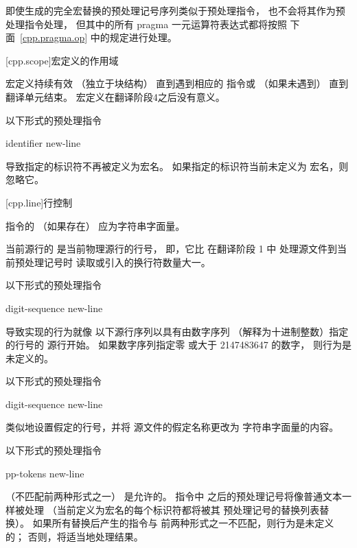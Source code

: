     \pnum
    即使生成的完全宏替换的预处理记号序列类似于预处理指令，
    也不会将其作为预处理指令处理，
    但其中的所有 pragma 一元运算符表达式都将按照
    下面~\ref{cpp.pragma.op} 中的规定进行处理。
    
    [cpp.scope]{宏定义的作用域}%
    
    \pnum
    宏定义持续有效
    （独立于块结构）
    直到遇到相应的
    指令或
    （如果未遇到）
    直到翻译单元结束。
    宏定义在翻译阶段4之后没有意义。
    
    \pnum
    以下形式的预处理指令
    \begin{ncsimplebnf}
     identifier new-line
    \end{ncsimplebnf}
    导致指定的标识符不再被定义为宏名。
    如果指定的标识符当前未定义为
    宏名，则忽略它。
    
    
    [cpp.line]{行控制}%
    
    \pnum
     指令的 （如果存在）
    应为字符串字面量。
    
    \pnum
    当前源行的 
    是当前物理源行的行号，
    即，它比
    在翻译阶段 1 中
    处理源文件到当前预处理记号时
    读取或引入的换行符数量大一。
    
    \pnum
    以下形式的预处理指令
    \begin{ncsimplebnf}
     digit-sequence new-line
    \end{ncsimplebnf}
    导致实现的行为就像
    以下源行序列以具有由数字序列
    （解释为十进制整数）指定的行号的
    源行开始。
    如果数字序列指定零
    或大于 2147483647 的数字，
    则行为是未定义的。
    
    \pnum
    以下形式的预处理指令
    \begin{ncsimplebnf}
     digit-sequence    new-line
    \end{ncsimplebnf}
    类似地设置假定的行号，并将
    源文件的假定名称更改为
    字符串字面量的内容。
    
    \pnum
    以下形式的预处理指令
    \begin{ncsimplebnf}
     pp-tokens new-line
    \end{ncsimplebnf}
    （不匹配前两种形式之一）
    是允许的。
    指令中 
    之后的预处理记号将像普通文本一样被处理
    （当前定义为宏名的每个标识符都将被其
    预处理记号的替换列表替换）。
    如果所有替换后产生的指令与
    前两种形式之一不匹配，则行为是未定义的；
    否则，将适当地处理结果。
    
